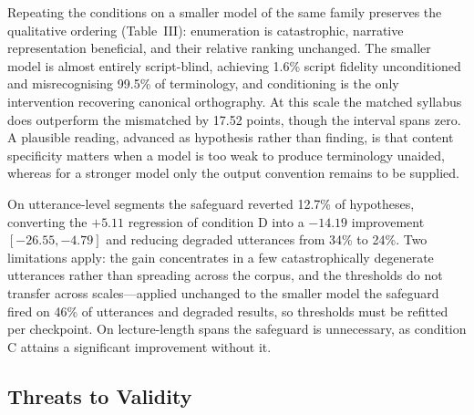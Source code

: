 \documentclass[conference]{IEEEtran}
\begin{document}
Repeating the conditions on a smaller model of the same family preserves the
qualitative ordering (Table~III): enumeration is catastrophic, narrative
representation beneficial, and their relative ranking unchanged. The smaller model
is almost entirely script-blind, achieving 1.6\% script fidelity unconditioned and
misrecognising 99.5\% of terminology, and conditioning is the only intervention
recovering canonical orthography. At this scale the matched syllabus does
outperform the mismatched by 17.52 points, though the interval spans zero. A
plausible reading, advanced as hypothesis rather than finding, is that content
specificity matters when a model is too weak to produce terminology unaided,
whereas for a stronger model only the output convention remains to be supplied.

\begin{table}[htbp]
\caption{Cross-Model Validation (150 utterances)}
\label{tab:crossmodel}
\centering
{}
\end{table}

On utterance-level segments the safeguard reverted 12.7\% of hypotheses,
converting the $+5.11$ regression of condition D into a $-14.19$ improvement
$[-26.55, -4.79]$ and reducing degraded utterances from 34\% to 24\%. Two
limitations apply: the gain concentrates in a few catastrophically degenerate
utterances rather than spreading across the corpus, and the thresholds do not
transfer across scales---applied unchanged to the smaller model the safeguard
fired on 46\% of utterances and degraded results, so thresholds must be refitted
per checkpoint. On lecture-length spans the safeguard is unnecessary, as condition
C attains a significant improvement without it.

\subsection{Threats to Validity}
\end{document}
